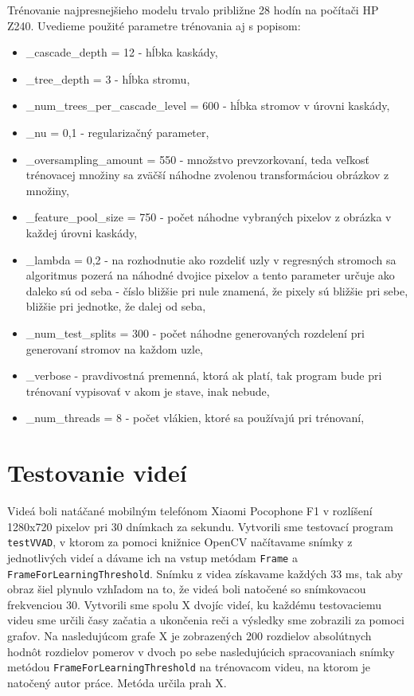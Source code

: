 Trénovanie najpresnejšieho modelu trvalo približne 28 hodín na počítači  HP Z240. Uvedieme použité parametre trénovania aj s popisom:
 \begin{itemize}
\item \_cascade\_depth = 12 - hĺbka kaskády, 
\item \_tree\_depth = 3 - hĺbka stromu, 
\item \_num\_trees\_per\_cascade\_level = 600 - hĺbka stromov v úrovni kaskády, 
\item \_nu = 0,1 - regularizačný parameter, 
\item \_oversampling\_amount = 550 - množstvo prevzorkovaní, teda veľkosť trénovacej množiny sa zväčší náhodne zvolenou transformáciou obrázkov z množiny, 
\item \_feature\_pool\_size = 750 - počet náhodne vybraných pixelov z obrázka v každej úrovni kaskády, 
\item \_lambda = 0,2 - na rozhodnutie ako rozdeliť uzly v regresných stromoch sa algoritmus pozerá na náhodné dvojice pixelov a tento parameter určuje ako daleko sú od seba - číslo bližšie pri nule znamená, že pixely sú bližšie pri sebe, bližšie pri jednotke, že dalej od seba, 
\item \_num\_test\_splits = 300 - počet náhodne generovaných rozdelení pri generovaní stromov na každom uzle,
\item \_verbose - pravdivostná premenná, ktorá ak platí, tak program bude pri trénovaní vypisovať v akom je stave, inak nebude, 
\item \_num\_threads = 8 - počet vlákien, ktoré sa používajú pri trénovaní, 
\end{itemize} 

\section{Testovanie videí}
Videá boli natáčané mobilným telefónom Xiaomi Pocophone F1 v rozlíšení 1280x720 pixelov pri 30 dnímkach za sekundu. 
Vytvorili sme testovací program \texttt{testVVAD}, v ktorom za pomoci knižnice OpenCV načítavame snímky z jednotlivých videí a dávame ich na vstup metódam \texttt{Frame} a \texttt{Frame\-For\-Learning\-Threshold}.
Snímku z videa získavame každých 33 ms, tak aby obraz šiel plynulo vzhľadom na to, že videá boli natočené so snímkovacou frekvenciou 30.
Vytvorili sme spolu X dvojíc videí, ku každému testovaciemu videu sme určili časy začatia a ukončenia reči a výsledky sme zobrazili za pomoci grafov. 
Na nasledujúcom grafe X je zobrazených 200 rozdielov absolútnych hodnôt rozdielov pomerov v dvoch po sebe nasledujúcich spracovaniach snímky metódou \texttt{Frame\-For\-Learning\-Threshold} na trénovacom videu, na ktorom je natočený autor práce.
Metóda určila prah X.

